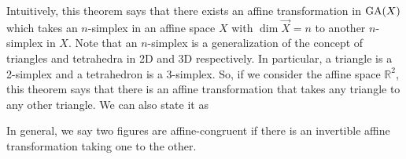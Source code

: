 Intuitively, this theorem says that there exists an affine transformation in
$\operatorname{GA}(X)$ which takes an $n$-simplex in an affine space $X$ with $\dim \vec{X}=n$
to another $n$-simplex in $X$. Note that an $n$-simplex is a generalization of the
concept of triangles and tetrahedra in 2D and 3D respectively. In particular, a
triangle is a 2-simplex and a tetrahedron is a 3-simplex. So, if we consider the
affine space $\mathbb{R}^2$, this theorem says that there is an affine
transformation that takes any triangle to any other triangle. We can also state it
as
\vspace{1ex}

\begin{center}
\end{center}
\vspace{1ex}

In general, we say two figures are affine-congruent if there is an invertible
affine transformation taking one to the other.
